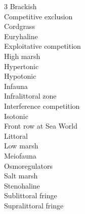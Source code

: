
\begin{multicols}{3}
Brackish\\
Competitive exclusion \\
Cordgrass \\
Euryhaline \\
Exploitative competition \\
High marsh \\
Hypertonic \\
Hypotonic \\
Infauna\\
Infralittoral zone\\
Interference competition \\
Isotonic \\
Front row at Sea World\\
Littoral \\
Low marsh \\
Meiofauna\\
Osmoregulators \\
Salt marsh \\
Stenohaline\\
Sublittoral fringe\\
Supralittoral fringe
\end{multicols}